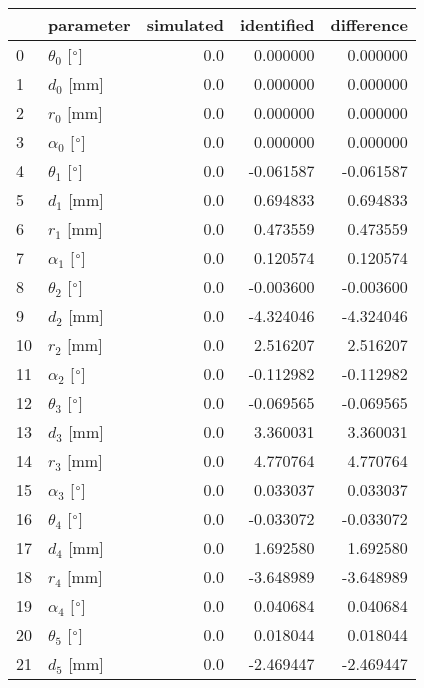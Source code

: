 \documentclass{standalone}%
\begin{document}
%
\normalsize%
\begin{tabular}{llrrr}
\toprule
{} &                 parameter & simulated & identified & difference \\
\midrule
0  &  $\theta_{0}$ [$\degree$] &       0.0 &   0.000000 &   0.000000 \\
1  &              $d_{0}$ [mm] &       0.0 &   0.000000 &   0.000000 \\
2  &              $r_{0}$ [mm] &       0.0 &   0.000000 &   0.000000 \\
3  &  $\alpha_{0}$ [$\degree$] &       0.0 &   0.000000 &   0.000000 \\
4  &  $\theta_{1}$ [$\degree$] &       0.0 &  -0.061587 &  -0.061587 \\
5  &              $d_{1}$ [mm] &       0.0 &   0.694833 &   0.694833 \\
6  &              $r_{1}$ [mm] &       0.0 &   0.473559 &   0.473559 \\
7  &  $\alpha_{1}$ [$\degree$] &       0.0 &   0.120574 &   0.120574 \\
8  &  $\theta_{2}$ [$\degree$] &       0.0 &  -0.003600 &  -0.003600 \\
9  &              $d_{2}$ [mm] &       0.0 &  -4.324046 &  -4.324046 \\
10 &              $r_{2}$ [mm] &       0.0 &   2.516207 &   2.516207 \\
11 &  $\alpha_{2}$ [$\degree$] &       0.0 &  -0.112982 &  -0.112982 \\
12 &  $\theta_{3}$ [$\degree$] &       0.0 &  -0.069565 &  -0.069565 \\
13 &              $d_{3}$ [mm] &       0.0 &   3.360031 &   3.360031 \\
14 &              $r_{3}$ [mm] &       0.0 &   4.770764 &   4.770764 \\
15 &  $\alpha_{3}$ [$\degree$] &       0.0 &   0.033037 &   0.033037 \\
16 &  $\theta_{4}$ [$\degree$] &       0.0 &  -0.033072 &  -0.033072 \\
17 &              $d_{4}$ [mm] &       0.0 &   1.692580 &   1.692580 \\
18 &              $r_{4}$ [mm] &       0.0 &  -3.648989 &  -3.648989 \\
19 &  $\alpha_{4}$ [$\degree$] &       0.0 &   0.040684 &   0.040684 \\
20 &  $\theta_{5}$ [$\degree$] &       0.0 &   0.018044 &   0.018044 \\
21 &              $d_{5}$ [mm] &       0.0 &  -2.469447 &  -2.469447 \\

\end{tabular}
\end{document}
